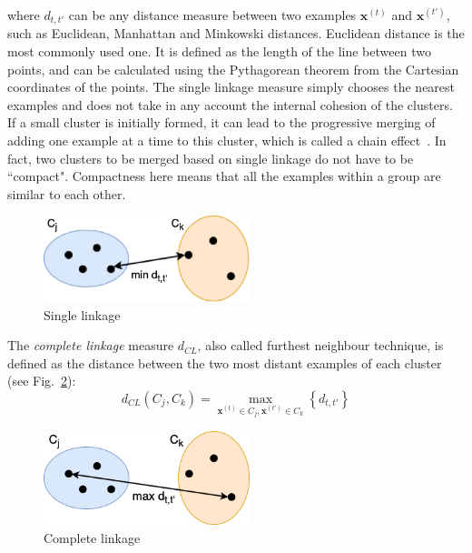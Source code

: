 \noindent
where $d_{t,t'}$ can be any distance measure between two examples $\mathbf{x}^{\left ( t \right )}$ and $\mathbf{x}^{\left ( t' \right )}$, such as Euclidean, Manhattan and Minkowski distances. Euclidean distance is the most commonly used one. It is defined as the length of the line between two points, and can be calculated using the Pythagorean theorem from the Cartesian coordinates of the points. The single linkage measure simply chooses the nearest examples and does not take in any account the internal cohesion of the clusters. If a small cluster is initially formed, it can lead to the progressive merging of adding one example at a time to this cluster, which is called a chain effect~\cite{Marini2020}. In fact, two clusters to be merged based on single linkage do not have to be ``compact". Compactness here means that all the examples within a group are similar to each other.

\begin{figure}[htp]
\centering
\captionsetup{justification=centering}
\includegraphics[width=6cm]{"Part 3 - Learning Systems/Unsupervised Learning/Hierarchical Clustering/figures/SingleLinkage.png"}
\caption{Single linkage}
\label{fig:sl}
\end{figure}

The \textit{complete linkage} measure $d_{CL}$, also called furthest neighbour technique, is defined as the distance between the two most distant examples of each cluster (see Fig.~\ref{fig:cl}):
\[
d_{CL}\left ( C_j, C_k \right ) = \max_{\mathbf{x}^{\left ( t \right )} \in C_j, \mathbf{x}^{\left ( t' \right )} \in C_k} \left\{ d_{t,t'} \right\}
\]

\begin{figure}[htp]
\centering
\captionsetup{justification=centering}
\includegraphics[width=6cm]{"Part 3 - Learning Systems/Unsupervised Learning/Hierarchical Clustering/figures/CompleteLinkage.png"}
\caption{Complete linkage}
\label{fig:cl}
\end{figure}

